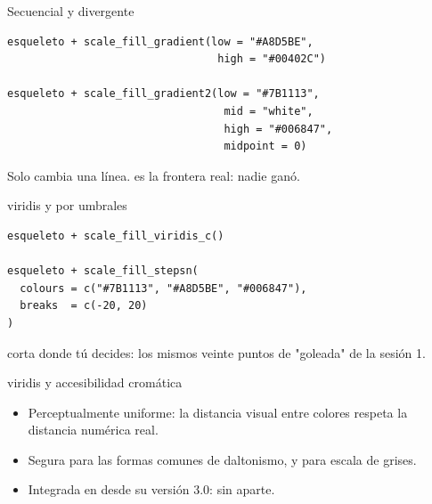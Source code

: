 \begin{frame}[fragile]{Secuencial y divergente}
\begin{lstlisting}
esqueleto + scale_fill_gradient(low = "#A8D5BE",
                                 high = "#00402C")

esqueleto + scale_fill_gradient2(low = "#7B1113",
                                  mid = "white",
                                  high = "#006847",
                                  midpoint = 0)
\end{lstlisting}

  \vspace{0.5em}
  Solo cambia una línea.  es la frontera real: nadie
  ganó.
\end{frame}

\begin{frame}[fragile]{viridis y por umbrales}
\begin{lstlisting}
esqueleto + scale_fill_viridis_c()

esqueleto + scale_fill_stepsn(
  colours = c("#7B1113", "#A8D5BE", "#006847"),
  breaks  = c(-20, 20)
)
\end{lstlisting}

  \vspace{0.5em}
   corta donde tú decides: los mismos veinte puntos de
  "goleada" de la sesión 1.
\end{frame}

\begin{frame}{viridis y accesibilidad cromática}
  \vspace{0.3em}
  \begin{itemize}\setlength{\itemsep}{0.85em}
    \item<1-> Perceptualmente uniforme: la distancia visual entre colores
          respeta la distancia numérica real.
    \item<2-> Segura para las formas comunes de daltonismo, y para
          escala de grises.
    \item<3-> Integrada en  desde su versión 3.0: sin
           aparte.
  \end{itemize}

  \vspace{1.1em}
\end{frame}

